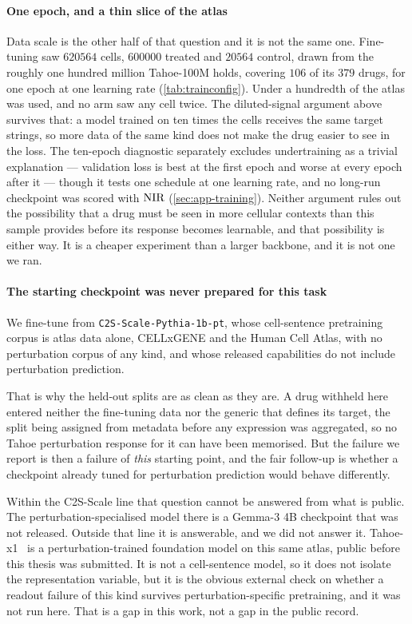 \paragraph{One epoch, and a thin slice of the atlas} Data scale is the other
half of that question and it is not the same one. Fine-tuning saw
$\num{620564}$ cells, $\num{600000}$ treated and $\num{20564}$ control, drawn
from the roughly one hundred million Tahoe-100M holds, covering $106$ of its $379$ drugs, for one epoch at one learning rate
(\cref{tab:trainconfig}). Under a hundredth of the atlas was used, and no arm saw
any cell twice. The diluted-signal argument above survives that: a model trained
on ten times the cells receives the same target strings, so more data of the same
kind does not make the drug easier to see in the loss. The ten-epoch diagnostic separately excludes undertraining as a trivial explanation --- validation loss is best at the first epoch and worse at every epoch after it --- though it tests one schedule at one learning rate, and no long-run checkpoint was scored with $\textrm{NIR}$ (\cref{sec:app-training}).
Neither argument rules out the possibility that a drug must be seen in more
cellular contexts than this sample provides before its response becomes
learnable, and that possibility is \notestablished either way. It is a cheaper
experiment than a larger backbone, and it is not one we ran.

\paragraph{The starting checkpoint was never prepared for this task} We
fine-tune from \texttt{C2S-Scale-Pythia-1b-pt}, whose cell-sentence pretraining
corpus is atlas data alone, CELLxGENE and the Human Cell Atlas, with no
perturbation corpus of any kind, and whose released capabilities do not include
perturbation prediction.

That is why the held-out splits are as clean as they are. A drug withheld here
entered neither the fine-tuning data nor the generic that defines its target,
the split being assigned from metadata before any expression was aggregated, so
no Tahoe perturbation response for it can have been memorised. But the failure
we report is then a failure of \emph{this} starting point, and the fair
follow-up is whether a checkpoint already tuned for perturbation prediction
would behave differently.

Within the C2S-Scale line that question cannot be answered from what is public.
The perturbation-specialised model there is a Gemma-3 4B checkpoint that was not
released. Outside that line it is answerable, and we did not answer it.
Tahoe-x1~\cite{tahoex1} is a perturbation-trained foundation model on this same
atlas, public before this thesis was submitted. It is not a cell-sentence model,
so it does not isolate the representation variable, but it is the obvious
external check on whether a readout failure of this kind survives
perturbation-specific pretraining, and it was not run here. That is a gap in
this work, not a gap in the public record.


